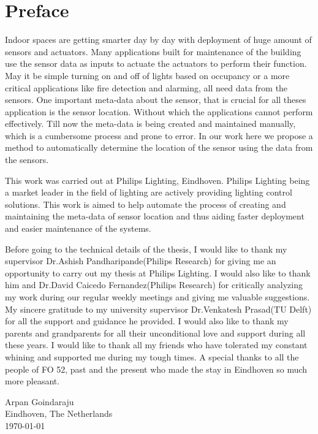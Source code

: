 \chapter*{Preface}


\vspace{1\baselineskip}

\noindent
Indoor spaces are getting smarter day by day with deployment of huge amount of sensors and actuators. Many applications built for maintenance of the building use the sensor data as inputs to actuate the actuators to perform their function. May it be simple turning on and off of lights based on occupancy or a more critical applications like fire detection and alarming, all need data from the sensors. One important meta-data about the sensor, that is crucial for all theses application is the sensor location. Without which the applications cannot perform effectively. Till now the meta-data is being created and maintained manually, which is a cumbersome process and prone to error. In our work here we propose a method to automatically determine the location of the sensor using the data from the sensors.

This work was carried out at Philips Lighting, Eindhoven. Philips Lighting being a market leader in the field of lighting are actively providing lighting control solutions. This work is aimed to help automate the process of creating and maintaining the meta-data of sensor location and thus aiding faster deployment and easier maintenance of the systems.

Before going to the technical details of the thesis, I would like to thank my supervisor Dr.Ashish Pandharipande(Philips Research) for giving me an opportunity to carry out my thesis at Philips Lighting. I would also like to thank him and Dr.David Caicedo Fernandez(Philips Research) for critically analyzing my work during our regular weekly meetings and giving me valuable suggestions. My sincere gratitude to my university supervisor Dr.Venkatesh Prasad(TU Delft) for all the support and guidance he provided. I would also like to thank my parents and grandparents for all their unconditional love and support during all these years.
I would like to thank all my friends who have tolerated my constant whining and supported me during my tough times.
A special thanks to all the people of FO 52, past and the present who made the stay in Eindhoven so much more pleasant.

\vspace{1\baselineskip}

\noindent
Arpan Goindaraju\\
Eindhoven, The Netherlands\\
\today

